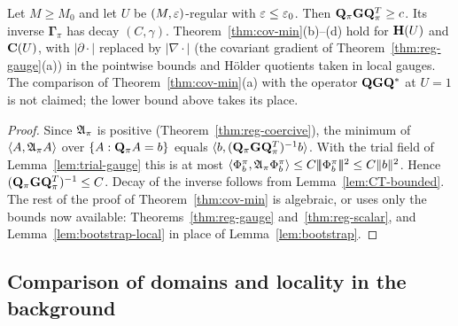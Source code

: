 \begin{theorem}\label{thm:reg-min}
Let $M\ge M_0$ and let $U$ be $(M,\varepsilon)$-regular with $\varepsilon\le\varepsilon_0$. Then $\mathbf Q_\pi\mathbf G\mathbf Q_\pi^T\ge c$. Its inverse $\boldsymbol\Gamma_\pi$ has decay $(C,\gamma)$. Theorem~\ref{thm:cov-min}(b)--(d) hold for $\mathbf H(U)$ and $\mathbf C(U)$, with $|\partial\cdot|$ replaced by $|\nabla\cdot|$ (the covariant gradient of Theorem~\ref{thm:reg-gauge}(a)) in the pointwise bounds and H\"older quotients taken in local gauges. The comparison of Theorem~\ref{thm:cov-min}(a) with the operator $\mathbf Q\mathbf G\mathbf Q^*$ at $U=1$ is not claimed; the lower bound above takes its place.
\end{theorem}

\begin{proof}
Since $\mathfrak A_\pi$ is positive (Theorem~\ref{thm:reg-coercive}), the minimum of $\langle A,\mathfrak A_\pi A\rangle$ over $\{A:\mathbf Q_\pi A=b\}$ equals $\langle b,(\mathbf Q_\pi\mathbf G\mathbf Q_\pi^T)^{-1}b\rangle$. With the trial field of Lemma~\ref{lem:trial-gauge} this is at most $\langle \Phi^\pi_b,\mathfrak A_\pi\Phi^\pi_b\rangle\le C|\!|\!|\Phi^\pi_b|\!|\!|^2\le C\|b\|^2$. Hence $(\mathbf Q_\pi\mathbf G\mathbf Q_\pi^T)^{-1}\le C$. Decay of the inverse follows from Lemma~\ref{lem:CT-bounded}. The rest of the proof of Theorem~\ref{thm:cov-min} is algebraic, or uses only the bounds now available: Theorems~\ref{thm:reg-gauge} and~\ref{thm:reg-scalar}, and Lemma~\ref{lem:bootstrap-local} in place of Lemma~\ref{lem:bootstrap}.
\end{proof}

\subsection{Comparison of domains and locality in the background}

